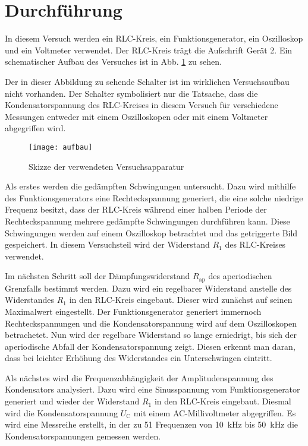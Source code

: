 
\section{Durchführung}
In diesem Versuch werden ein RLC-Kreis, ein Funktionsgenerator, ein Oszilloskop und ein Voltmeter verwendet. Der RLC-Kreis trägt die Aufschrift \glqq Gerät 2\grqq.
Ein schematischer Aufbau des Versuches ist in Abb. \ref{fig:aufbau} zu sehen.

Der in dieser Abbildung zu sehende Schalter ist im wirklichen Versuchsaufbau nicht vorhanden. Der Schalter  symbolisiert nur die Tatsache, dass die Kondensatorspannung des RLC-Kreises in diesem Versuch für verschiedene Messungen entweder mit einem Oszilloskopen oder mit einem Voltmeter abgegriffen wird.
%
\begin{figure}
\centering
\texttt{[image: aufbau]}
\caption{Skizze der verwendeten Versuchsapparatur}
\label{fig:aufbau}
\end{figure}
%


Als erstes werden die gedämpften Schwingungen untersucht. Dazu wird mithilfe des Funktionsgenerators eine Rechteckspannung generiert, die eine solche niedrige Frequenz besitzt, dass der RLC-Kreis während einer halben Periode der Rechteckspannung mehrere gedämpfte Schwingungen durchführen kann.
Diese Schwingungen werden auf einem Oszilloskop betrachtet und das getriggerte Bild gespeichert.
In diesem Versuchsteil wird der Widerstand $R_1$ des RLC-Kreises verwendet.

Im nächsten Schritt soll der Dämpfungswiderstand $R_\text{ap}$ des aperiodischen Grenzfalls bestimmt werden. Dazu wird ein regelbarer Widerstand anstelle des Widerstandes $R_1$ in den RLC-Kreis eingebaut. Dieser wird zunächst auf seinen Maximalwert eingestellt. Der Funktionsgenerator generiert immernoch Rechteckspannungen und die Kondensatorspannung wird auf dem Oszilloskopen betrachetet.
Nun wird der regelbare Widerstand so lange erniedrigt, bis sich der aperiodische Abfall der Kondensatorspannung zeigt. Diesen erkennt man daran, dass bei leichter Erhöhung des Widerstandes ein Unterschwingen eintritt.

Als nächstes wird die Frequenzabhängigkeit der Amplitudenspannung des Kondensators analysiert. Dazu wird eine Sinusspannung vom Funktionsgenerator generiert und wieder der Widerstand $R_1$ in den RLC-Kreis eingebaut. 
Diesmal wird die Kondensatorspannung $U_\text{C}$ mit einem AC-Millivoltmeter abgegriffen. Es wird eine Messreihe erstellt, in der zu 51 Frequenzen von \SI{10}{\kilo\hertz} bis \SI{50}{\kilo\hertz} die Kondensatorspannungen gemessen werden.

